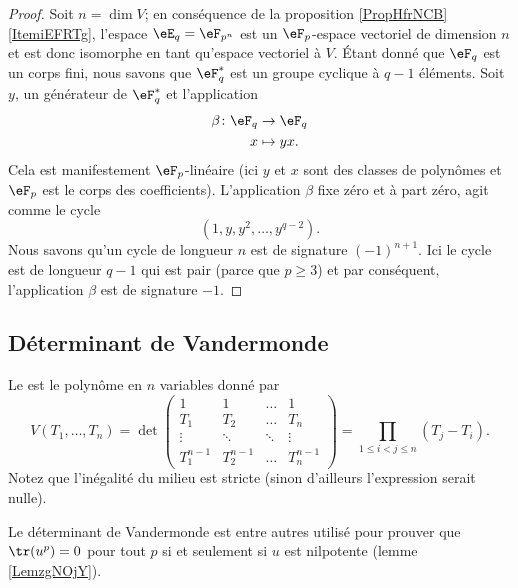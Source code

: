 \begin{proof}
    Soit \( n=\dim V\); en conséquence de la proposition \ref{PropHfrNCB}\ref{ItemiEFRTg}, l'espace \( \eE_q=\eF_{p^n}\) est un \( \eF_p\)-espace vectoriel de dimension \( n\) et est donc isomorphe en tant qu'espace vectoriel à \( V\). Étant donné que \( \eF_q\) est un corps fini, nous savons que \( \eF_q^*\) est un groupe cyclique à \( q-1\) éléments. Soit \( y\), un générateur de \( \eF_q^*\) et l'application
    \begin{equation}
        \begin{aligned}
            \beta\colon \eF_q&\to \eF_q \\
            x&\mapsto yx. 
        \end{aligned}
    \end{equation}
    Cela est manifestement \( \eF_p\)-linéaire (ici \( y\) et \( x\) sont des classes de polynômes et \( \eF_p\) est le corps des coefficients). L'application \( \beta\) fixe zéro et à part zéro, agit comme le cycle
    \begin{equation}
        (1,y,y^2,\ldots, y^{q-2}).
    \end{equation}
    Nous savons qu'un cycle de longueur \( n\) est de signature \( (-1)^{n+1}\). Ici le cycle est de longueur \( q-1\) qui est pair (parce que \( p\geq 3\)) et par conséquent, l'application \( \beta\) est de signature \( -1\).
\end{proof}

\subsection{Déterminant de Vandermonde}

\begin{proposition}  \label{PropnuUvtj}
    Le  est le polynôme en \( n\) variables donné par
    \begin{equation}
        V(T_1,\ldots, T_n)=\det\begin{pmatrix}
             1   &   1    &   \ldots    &   1    \\
             T_1   &   T_2    &   \ldots    &   T_n    \\
             \vdots   &   \ddots    &   \ddots    &   \vdots    \\ 
             T_1^{n-1}   &   T_2^{n-1}    &   \ldots    &   T_n^{n-1}     
         \end{pmatrix}=\prod_{1\leq i<j\leq n}(T_j-T_i).
    \end{equation}
    Notez que l'inégalité du milieu est stricte (sinon d'ailleurs l'expression serait nulle).
\end{proposition}
Le déterminant de Vandermonde est entre autres utilisé pour prouver que \( \tr(u^p)=0\) pour tout \( p\) si et seulement si \( u\) est nilpotente (lemme \ref{LemzgNOjY}).

